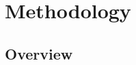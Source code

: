 \documentclass[10pt,journal,compsoc]{IEEEtran}
\begin{document}
\section{Methodology}
\subsection{Overview}
\label{subsec:overview}




\end{document}
